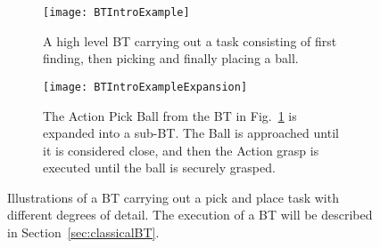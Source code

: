 \begin{figure}[ht!]
    \centering

    \begin{subfigure}[t]{\columnwidth}
        \centering
\texttt{[image: BTIntroExample]}
   \caption{A high level BT carrying out a task consisting of first finding, then picking and finally placing a ball.  }
   \label{introduction.fig.BTsmall}
    \end{subfigure}
    \vspace*{0.5cm}
    
    
      \begin{subfigure}[t]{\columnwidth}
        \centering
\texttt{[image: BTIntroExampleExpansion]}
   \caption{The Action Pick Ball from the BT in Fig.~\ref{introduction.fig.BTsmall} is expanded into a sub-BT. The Ball is approached until it is considered close, and then the Action grasp is executed until the ball is securely grasped.}
      \label{introduction.fig.BTextended}
    \end{subfigure}
    \vspace{1em}
    \caption{Illustrations of a BT carrying out a pick and place task with different degrees of detail. The execution of a BT will be described in Section~\ref{sec:classicalBT}.}
    \label{introduction.fig.BT}
\end{figure}




